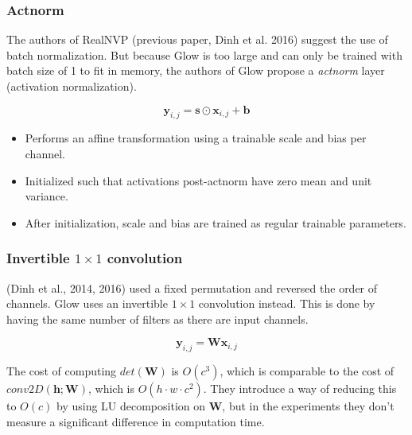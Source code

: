\documentclass{beamer}
\begin{document}
\begin{frame}
  \frametitle{Actnorm}

  The authors of RealNVP (previous paper, Dinh et al. 2016) suggest the use of
  batch normalization. But because Glow is too large and can only be trained
  with batch size of 1 to fit in memory, the authors of Glow propose a
  \emph{actnorm} layer (activation normalization).

  \[
    \symbf{y}_{i,j} = \symbf{s} \odot \symbf{x}_{i,j} + \symbf{b}
  \]

  \begin{itemize}
    \item Performs an affine transformation using a trainable scale and bias
      per channel.

    \item Initialized such that activations post-actnorm have zero mean and
      unit variance.

    \item After initialization, scale and bias are trained as regular trainable
      parameters.
  \end{itemize}


\end{frame}

\begin{frame}
  \frametitle{Invertible $1\times1$ convolution}

  (Dinh et al., 2014, 2016) used a fixed permutation and reversed the order of
  channels. Glow uses an invertible $1\times1$ convolution instead. This is
  done by having the same number of filters as there are input channels.

  \[
    \symbf{y}_{i,j} = \symbf{W}\symbf{x}_{i,j}
  \]

  The cost of computing $det(\symbf{W})$ is $O(c^3)$, which is comparable to the cost
  of $conv2D(\symbf{h}; \symbf{W})$, which is $O(h \cdot w \cdot c^2)$. They introduce
  a way of reducing this to $O(c)$ by using LU decomposition on $\symbf{W}$, but in the
  experiments they don't measure a significant difference in computation time.
\end{frame}
\end{document}
